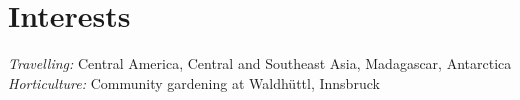 \documentclass[a4paper]{twentysecondcv} %
\begin{document}
\vspace*{0.7em}



\section{Interests}

\emph{Travelling: }Central America, Central and Southeast Asia, Madagascar, Antarctica\\
\emph{Horticulture: }Community gardening at Waldh\"uttl, Innsbruck\
\end{document}

